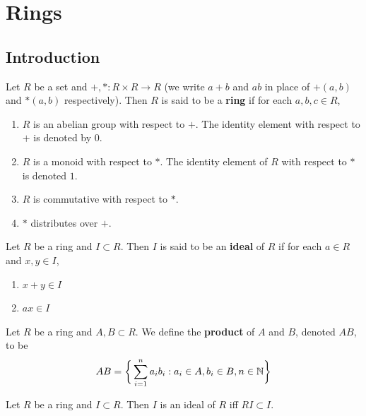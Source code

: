 \documentclass{book}
\begin{document}
	
	
	
	
	
	
	
	
	
	
	
	\newpage
	\chapter{Rings}
	
	\section{Introduction}
	
	\begin{defn}
		Let $R$ be a set and $+, *: R \times R 				
		\rightarrow R$ (we write $a+b$ and 
		$ab$ in place of $+(a,b)$ and $*(a,b)$ respectively).
		Then $R$ is said to be a \textbf{ring} if for each 
		$a,b,c \in R$,
		\begin{enumerate}
			\item $R$ is an abelian group with respect to $+$.
			The identity element with respect to $+$ is denoted
			by $0$.
			\item $R$ is a monoid with respect to $*$. The  
			identity element of $R$ with respect to $*$ is denoted $1$. 
			\item $R$ is commutative with respect to $*$.
			\item $*$ distributes over $+$.
		\end{enumerate}
	\end{defn}
	
	\begin{defn}
		Let $R$ be a ring and $I \subset R$. Then $I$ is said 
		to be an \textbf{ideal} of $R$ if for each $a \in R$ and $x,y \in I$,
		\begin{enumerate}
			\item  $x + y \in I$
			\item  $ax \in I$
		\end{enumerate}
	\end{defn}
	
	\begin{defn}
		Let $R$ be a ring and $A,B \subset R$. We define the \textbf{product} of $A$ and $B$, denoted $AB$, to be $$AB = \bigg \{\sum_{i=1}^n a_ib_i: a_i \in A, b_i \in B, n \in \mathbb{N} \bigg \}$$
	\end{defn}	
	
	\begin{ex}
		Let $R$ be a ring and $I \subset R$. Then $I$ is an ideal of $R$ iff $RI \subset I$. 
	\end{ex}
	
\end{document}

